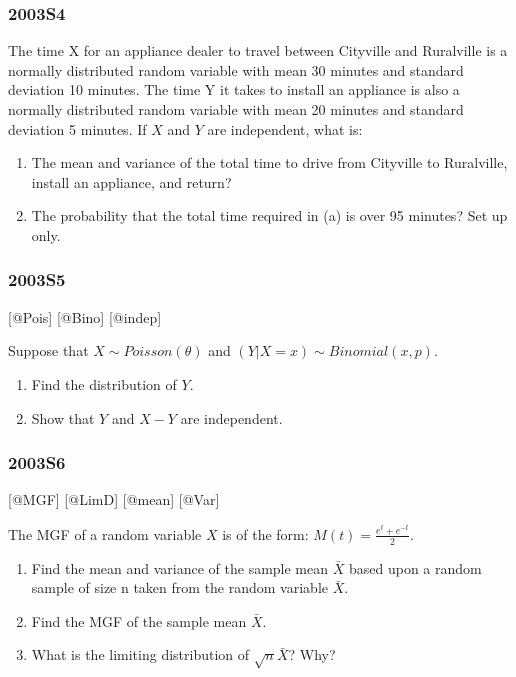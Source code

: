\documentclass[6pt,Portrait]{article}
\begin{document}
\hypertarget{s4}{%
\subsubsection{2003S4}\label{s4}}

The time X for an appliance dealer to travel between Cityville and
Ruralville is a normally distributed random variable with mean 30
minutes and standard deviation 10 minutes. The time Y it takes to
install an appliance is also a normally distributed random variable with
mean 20 minutes and standard deviation 5 minutes. If \(X\) and \(Y\) are
independent, what is:

\begin{enumerate}
\def\labelenumi{\Alph{enumi})}
\item
  The mean and variance of the total time to drive from Cityville to
  Ruralville, install an appliance, and return?
\item
  The probability that the total time required in (a) is over 95
  minutes? Set up only.
\end{enumerate}

\hypertarget{s5}{%
\subsubsection{2003S5}\label{s5}}

{[}@Pois{]} {[}@Bino{]} {[}@indep{]}

Suppose that \(X\sim Poisson(\theta)\) and
\((Y|X=x)\sim Binomial(x,p)\).

\begin{enumerate}
\def\labelenumi{\Alph{enumi})}
\item
  Find the distribution of \(Y\).
\item
  Show that \(Y\) and \(X-Y\) are independent.
\end{enumerate}

\hypertarget{s6}{%
\subsubsection{2003S6}\label{s6}}

{[}@MGF{]} {[}@LimD{]} {[}@mean{]} {[}@Var{]}

The MGF of a random variable \(X\) is of the form:
\(M(t)=\frac{e^t+e^{-t}}2\).

\begin{enumerate}
\def\labelenumi{\Alph{enumi})}
\item
  Find the mean and variance of the sample mean \(\bar X\) based upon a
  random sample of size n taken from the random variable \(\bar X\).
\item
  Find the MGF of the sample mean \(\bar X\).
\item
  What is the limiting distribution of \(\sqrt{n}\bar X\)? Why?
\end{enumerate}
\end{document}
